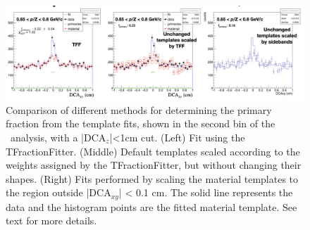 \begin{figure}
    \centering
    \includegraphics[width=\textwidth]{figures/comparison_template_fitting_techniques.png}
    \caption{Comparison of different methods for determining the primary fraction from the template fits, shown in the second bin of the \ahe\ analysis, with a |DCA$_z$|<1cm cut. (Left) Fit using the TFractionFitter. (Middle) Default templates scaled according to the weights assigned by the TFractionFitter, but without changing their shapes. (Right) Fits performed by scaling the material templates to the region outside |DCA$_{xy}$| < 0.1 cm. The solid line represents the data and the histogram points are the fitted material template. See text for more details.}
    \label{fig:Template_Fit_methods_comparison}
\end{figure}



